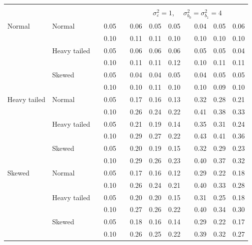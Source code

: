\documentclass[12pt]{article} %
\begin{document}
\begin{table}[ht]
\begin{scriptsize}
\begin{center}
\begin{tabular}{ll p{.1cm} c p{.1cm} rrr p{.1cm} rrr}
&&&&&&&&&&&\\
& && && \multicolumn{7}{c}{$\sigma_{\varepsilon}^2 = 1$, \ \ $\sigma_{b_0}^2 = \sigma_{b_1}^2 = 4$} \\ \cline{6-12}
Normal       & Normal       && 0.05 &&  0.06 & 0.05 & 0.05 && 0.04 & 0.05 & 0.06 \\ 
             &              && 0.10 &&  0.11 & 0.11 & 0.10 && 0.10 & 0.10 & 0.10 \\ 
             & Heavy tailed && 0.05 &&  0.06 & 0.06 & 0.06 && 0.05 & 0.05 & 0.04 \\ 
             &              && 0.10 &&  0.11 & 0.11 & 0.12 && 0.10 & 0.11 & 0.11 \\ 
             & Skewed       && 0.05 &&  0.04 & 0.04 & 0.05 && 0.04 & 0.05 & 0.05 \\ 
             &              && 0.10 &&  0.10 & 0.11 & 0.10 && 0.10 & 0.09 & 0.10 \\ 
Heavy tailed & Normal       && 0.05 &&  0.17 & 0.16 & 0.13 && 0.32 & 0.28 & 0.21 \\ 
             &              && 0.10 &&  0.26 & 0.24 & 0.22 && 0.41 & 0.38 & 0.33 \\ 
             & Heavy tailed && 0.05 &&  0.21 & 0.19 & 0.14 && 0.35 & 0.31 & 0.24 \\ 
             &              && 0.10 &&  0.29 & 0.27 & 0.22 && 0.43 & 0.41 & 0.36 \\ 
             & Skewed       && 0.05 &&  0.20 & 0.19 & 0.15 && 0.32 & 0.29 & 0.23 \\ 
             &              && 0.10 &&  0.29 & 0.26 & 0.23 && 0.40 & 0.37 & 0.32 \\ 
Skewed       & Normal       && 0.05 &&  0.17 & 0.16 & 0.12 && 0.29 & 0.22 & 0.18 \\ 
             &              && 0.10 &&  0.26 & 0.24 & 0.21 && 0.40 & 0.33 & 0.28 \\ 
             & Heavy tailed && 0.05 &&  0.20 & 0.20 & 0.15 && 0.31 & 0.25 & 0.18 \\ 
             &              && 0.10 &&  0.27 & 0.26 & 0.22 && 0.40 & 0.34 & 0.30 \\ 
             & Skewed       && 0.05 &&  0.18 & 0.16 & 0.14 && 0.29 & 0.22 & 0.17 \\ 
             &              && 0.10 &&  0.26 & 0.25 & 0.22 && 0.39 & 0.32 & 0.27 \\ 

\hline
\end{tabular}
\end{center}
\end{scriptsize}
\end{table}
\end{document}
